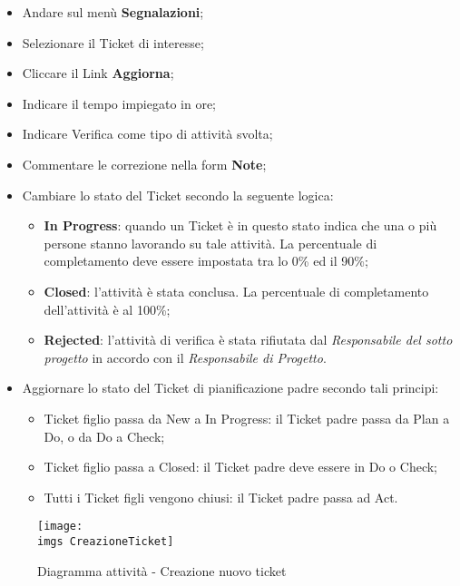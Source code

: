 \begin{itemize}
\item Andare sul menù \textbf{Segnalazioni}; 
\item Selezionare il Ticket di interesse; 
\item Cliccare il Link \textbf{Aggiorna}; 
\item Indicare il tempo impiegato in ore; 
\item Indicare Verifica come tipo di attività svolta; 
\item Commentare le correzione nella form \textbf{Note}; 
\item Cambiare lo stato del Ticket secondo la seguente logica:
		\begin{itemize}
		\item \textbf{In Progress}: quando un Ticket è in questo stato indica che una o più persone stanno lavorando su tale attività. La percentuale di completamento deve essere impostata tra lo 0\% ed il 90\%; 
		\item \textbf{Closed}: l’attività è stata conclusa. La percentuale di completamento dell’attività è al 100\%; 
		\item \textbf{Rejected}: l’attività di verifica è stata rifiutata dal \emph{Responsabile del sotto progetto} in accordo con il \emph{Responsabile di Progetto}. 
		
		\end{itemize}

\item Aggiornare lo stato del Ticket di pianificazione padre secondo tali principi:
		\begin{itemize}
		\item Ticket figlio passa da New a In Progress: il Ticket padre passa da Plan a Do, 
		o da Do a Check; 
		\item Ticket figlio passa a Closed: il Ticket padre deve essere in Do o Check; 
		\item Tutti i Ticket figli vengono chiusi: il Ticket padre passa ad Act. 
		
		\end{itemize} 

\end{itemize} 
\begin{figure}[H]
  \centering
    \texttt{[image: \\imgs CreazioneTicket]}
  \caption{Diagramma attività - Creazione nuovo ticket}
  \label{fig:CreazioneTicket}
\end{figure}

